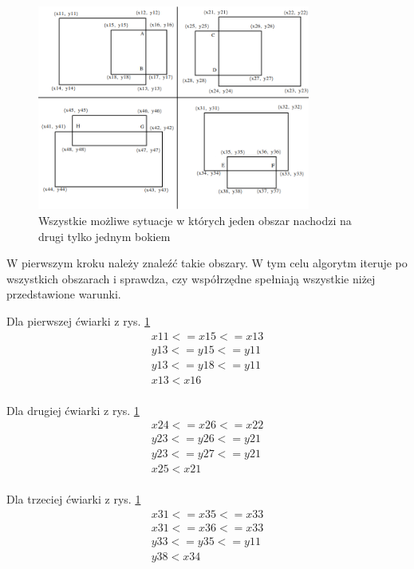 \begin{figure}[h]
\caption{Wszystkie możliwe sytuacje w których jeden obszar nachodzi na drugi tylko jednym  bokiem}
\label{fig:OneSideBounding}
\centering
\includegraphics[width=0.8\textwidth]{OneSideBounding}
\end{figure}

W pierwszym kroku należy znaleźć takie obszary. W tym celu algorytm iteruje po wszystkich obszarach i sprawdza, czy współrzędne spełniają wszystkie niżej przedstawione warunki.

Dla pierwszej ćwiarki z rys. \ref{fig:OneSideBounding}
\begin{equation}
\begin{split}
x11 <= x15 <= x13 \\
y13 <= y15 <= y11 \\
y13 <= y18 <= y11 \\
x13 < x16 \\
\end{split}
\end{equation}

Dla drugiej ćwiarki z rys. \ref{fig:OneSideBounding}
\begin{equation}
\begin{split}
x24 <= x26 <= x22 \\
y23 <= y26 <= y21 \\
y23 <= y27 <= y21 \\
x25 < x21 \\
\end{split}
\end{equation}

Dla trzeciej ćwiarki z rys. \ref{fig:OneSideBounding}
\begin{equation}
\begin{split}
x31 <= x35 <= x33 \\
x31 <= x36 <= x33 \\
y33 <= y35 <= y11 \\
y38 < x34 \\
\end{split}
\end{equation}

